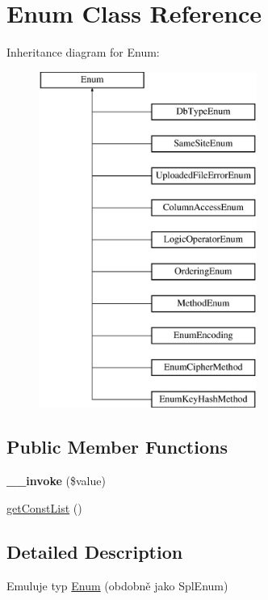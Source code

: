 \hypertarget{class_pes_1_1_type_1_1_enum}{}\section{Enum Class Reference}
\label{class_pes_1_1_type_1_1_enum}
Inheritance diagram for Enum\+:\begin{figure}[H]
\begin{center}
\leavevmode
\includegraphics[height=11.000000cm]{class_pes_1_1_type_1_1_enum}
\end{center}
\end{figure}
\subsection*{Public Member Functions}
\begin{DoxyCompactItemize}
\item 
\mbox{\label{class_pes_1_1_type_1_1_enum_af52adf7b2038ca0848cb7922f981226e}} 
{\bfseries \+\_\+\+\_\+invoke} (\$value)
\item 
\mbox{\hyperlink{class_pes_1_1_type_1_1_enum_a922c1b7210fe6ace59e7be671f91062e}{get\+Const\+List}} ()
\end{DoxyCompactItemize}


\subsection{Detailed Description}
Emuluje typ \mbox{\hyperlink{class_pes_1_1_type_1_1_enum}{Enum}} (obdobně jako Spl\+Enum)


